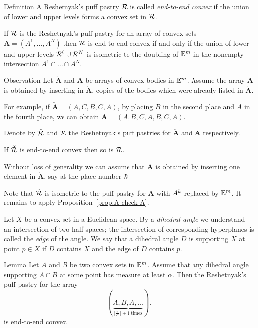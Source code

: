 \begin{thm}{Definition}
A Reshetnyak's puff pastry $\mathcal{R}$ 
is called \emph{end-to-end convex} 
if the union of lower and upper levels 
forms a convex set in $\mathcal{R}$.
\end{thm}

If $\mathcal{R}$ is the Reshetnyak's puff pastry for an array of convex sets $\bm{A}=(A^{1},\dots, A^{N})$
then $\mathcal{R}$ is end-to-end convex
if and only if the union of lower and upper levels
$\spc{R}^0\cup\spc{R}^N$ is isometric to the doubling of $\mathbb{E}^m$ in the nonempty intersection $A^1\cap\dots\cap A^N$.


\begin{thm}{Observation}\label{obs:end-to-end-convex}
Let $\check{\bm{A}}$ and $\bm{A}$ be arrays of convex bodies in $\mathbb{E}^m$.
Assume 
the  array $\bm{A}$ is
obtained by inserting in $\check{\bm{A}}$, 
copies of the bodies which were already listed in $\check{\bm{A}}$.

For example, if $\check{\bm{A}}=(A,C,B,C,A)$, by placing $B$ in the second place and $A$ in the fourth place, we can obtain $\bm{A}=(A,B,C,A,B,C,A)$.

Denote by $\check{\mathcal{R}}$ and $\mathcal{R}$ 
the Reshetnyak's puff pastries for $\check{\bm{A}}$ and $\bm{A}$ respectively.

If $\check{\mathcal{R}}$ is end-to-end convex then so is $\mathcal{R}$.
\end{thm}

Without loss of generality we can assume that $\bm{A}$ is 
obtained by inserting one element in $\check{\bm{A}}$,
say at the place number $\kay$.

Note that $\check{\mathcal{R}}$ is isometric to the puff pastry 
for $\bm{A}$ with $A^\kay$ replaced by $\mathbb{E}^m$.
It remains to apply Proposition~\ref{prop:A-check-A}.
\qeds


Let $X$ be a convex set in a Euclidean space.
By a \emph{dihedral angle} we understand an intersection of two half-spaces;
the intersection of corresponding hyperplanes is called the \emph{edge} of the angle.
We say that a dihedral angle $D$ is supporting $X$ at point $p\in X$ 
if $D$ contains $X$ and the edge of $D$ contains $p$.

\begin{thm}{Lemma}\label{lem:end-to-end-convex}
Let $A$ and $B$ be two convex sets in $\mathbb{E}^m$.
Assume that any dihedral angle supporting $A\cap B$ at some point has measure at least $\alpha$.
Then the Reshetnyak's puff pastry for the array
\[(\underbrace{A,B,A,\dots}_{\text{$\lceil\tfrac\pi\alpha\rceil+1$ times}}).\]
is end-to-end convex. 
\end{thm}


